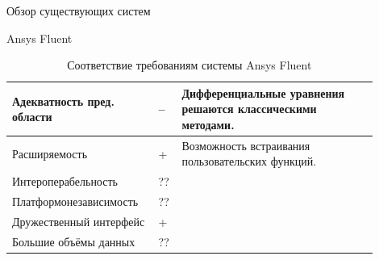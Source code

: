 \documentclass[a4paper,12pt]{extarticle}
\begin{document}
\begin{section}{Обзор существующих систем}
\begin{subsection}{Ansys Fluent}
    \begin{table}[h]
        \caption{Соответствие требованиям системы Ansys Fluent}
        \label{tabular:ansysfluent}
        \begin{center}
            \begin{tabular}{|p{0.35\linewidth}|p{0.05\linewidth}|p{0.5\linewidth}|} \hline
                Адекватность пред. области & -- & Дифференциальные уравнения решаются классическими методами. \\ \hline
                Расширяемость              & + & Возможность встраивания пользовательских функций. \\ \hline
                Интероперабельность        & ?? & \\ \hline
                Платформонезависимость     & ?? & \\ \hline
                Дружественный интерфейс    & + & \\ \hline
                Большие объёмы данных      & ?? & \\ \hline
            \end{tabular}
        \end{center}
    \end{table}
\end{subsection}

\end{section}
\end{document}
